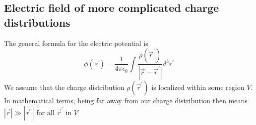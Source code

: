 \subsection{Electric field of more complicated charge distributions}
The general formula for the electric potential is
\begin{equation}
\phi(\vec{r})=\frac{1}{4 \pi \epsilon_{0}} \int \frac{\rho\left(\vec{r}^{\prime}\right)}{\left|\vec{r}-\vec{r}^{\prime}\right|} d^{3} r^{\prime}
\label{generalElectricPotential}
\end{equation}
We assume that the charge distribution $\rho\left(\vec{r}^{\prime}\right)$ is localized within some region $V .$ In mathematical terms, being far away from our charge distribution then means $|\vec{r}| \gg\left|\vec{r}^{\prime}\right|$ for all $\vec{r}^{\prime}$ in $V$


